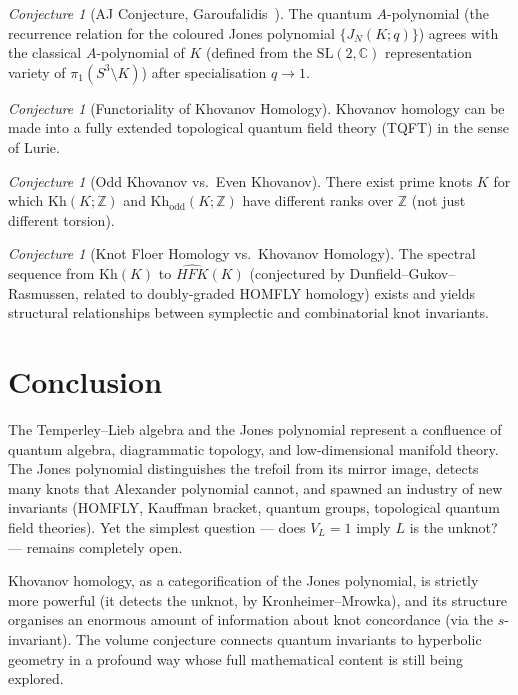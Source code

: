 \documentclass[12pt,a4paper]{amsart}
\theoremstyle{definition}
\theoremstyle{remark}
\newtheorem{conjecture}[theorem]{Conjecture}
\newcommand{\Z}{\mathbb{Z}}
\newcommand{\C}{\mathbb{C}}
\begin{document}
\begin{conjecture}[AJ Conjecture, Garoufalidis~\cite{Garoufalidis2004}]
\label{conj:AJ}
The quantum $A$-polynomial (the recurrence relation for the coloured Jones
polynomial $\{J_N(K;q)\}$) agrees with the classical $A$-polynomial of
$K$ (defined from the $\mathrm{SL}(2,\C)$ representation variety of
$\pi_1(S^3 \setminus K)$) after specialisation $q \to 1$.
\end{conjecture}

\begin{conjecture}[Functoriality of Khovanov Homology]
\label{conj:Kh-func}
Khovanov homology can be made into a fully extended topological quantum
field theory (TQFT) in the sense of Lurie.
\end{conjecture}

\begin{conjecture}[Odd Khovanov vs.\ Even Khovanov]
There exist prime knots $K$ for which $\mathrm{Kh}(K; \Z)$ and
$\mathrm{Kh}_{\mathrm{odd}}(K; \Z)$ have different ranks over $\Z$
(not just different torsion).
\end{conjecture}

\begin{conjecture}[Knot Floer Homology vs.\ Khovanov Homology]
The spectral sequence from $\mathrm{Kh}(K)$ to $\widehat{HFK}(K)$
(conjectured by Dunfield--Gukov--Rasmussen, related to doubly-graded HOMFLY
homology) exists and yields structural relationships between symplectic
and combinatorial knot invariants.
\end{conjecture}

\section{Conclusion}

The Temperley--Lieb algebra and the Jones polynomial represent a confluence
of quantum algebra, diagrammatic topology, and low-dimensional manifold theory.
The Jones polynomial distinguishes the trefoil from its mirror image, detects
many knots that Alexander polynomial cannot, and spawned an industry of
new invariants (HOMFLY, Kauffman bracket, quantum groups, topological quantum
field theories). Yet the simplest question — does $V_L = 1$ imply $L$ is
the unknot? — remains completely open.

Khovanov homology, as a categorification of the Jones polynomial, is
strictly more powerful (it detects the unknot, by Kronheimer--Mrowka),
and its structure organises an enormous amount of information about knot
concordance (via the $s$-invariant). The volume conjecture connects
quantum invariants to hyperbolic geometry in a profound way whose full
mathematical content is still being explored.
\end{document}
